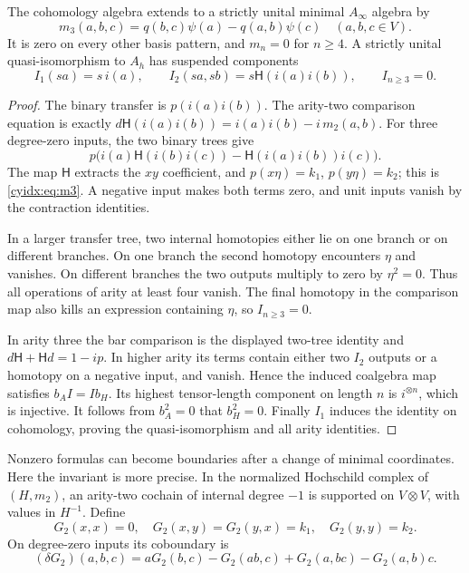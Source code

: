 \begin{theorem}\label{cyidx:thm:ternary}
The cohomology algebra extends to a strictly unital
minimal \(A_\infty\) algebra by
\begin{equation}\label{cyidx:eq:m3}
 m_3(a,b,c)=q(b,c)\psi(a)-q(a,b)\psi(c)
                       \quad(a,b,c\in V).
\end{equation}
It is zero on every other basis pattern, and
\(m_n=0\) for \(n\geq4\).
A strictly unital quasi-isomorphism to \(A_h\) has
suspended components
\begin{equation}\label{cyidx:eq:Ainfty-map}
 I_1(sa)=s\,i(a),\qquad
 I_2(sa,sb)=s\mathsf H(i(a)i(b)),\qquad I_{n\geq3}=0.
\end{equation}
\end{theorem}
\begin{proof}
The binary transfer is \(p(i(a)i(b))\). The arity-two
comparison equation is exactly
\(d\mathsf H(i(a)i(b))=i(a)i(b)-i\,m_2(a,b)\).
For three degree-zero inputs, the two binary trees give
\[
 p\bigl(i(a)\mathsf H(i(b)i(c))
              -\mathsf H(i(a)i(b))i(c)\bigr).
\]
The map \(\mathsf H\) extracts the \(xy\) coefficient,
and \(p(x\eta)=k_1\), \(p(y\eta)=k_2\); this is
\eqref{cyidx:eq:m3}. A negative input makes both
terms zero, and unit inputs vanish by the contraction
identities.

In a larger transfer tree, two internal homotopies
either lie on one branch or on different branches.
On one branch the second homotopy encounters \(\eta\)
and vanishes. On different branches the two outputs
multiply to zero by \(\eta^2=0\). Thus all operations
of arity at least four vanish. The final homotopy in
the comparison map also kills an expression containing
\(\eta\), so \(I_{n\geq3}=0\).

In arity three the bar comparison is the displayed
two-tree identity and \(d\mathsf H+\mathsf Hd=1-ip\).
In higher arity its terms contain either two \(I_2\)
outputs or a homotopy on a negative input, and vanish.
Hence the induced coalgebra map satisfies \(b_A I=I b_H\).
Its highest tensor-length component on length \(n\)
is \(i^{\otimes n}\), which is injective. It follows
from \(b_A^2=0\) that \(b_H^2=0\). Finally \(I_1\)
induces the identity on cohomology, proving the
quasi-isomorphism and all arity identities.
\end{proof}

Nonzero formulas can become boundaries after a change
of minimal coordinates. Here the invariant is more
precise. In the normalized Hochschild complex of
\((H,m_2)\), an arity-two cochain of internal degree
\(-1\) is supported on \(V\otimes V\), with values
in \(H^{-1}\). Define
\begin{equation}\label{cyidx:eq:G2}
 G_2(x,x)=0,\quad G_2(x,y)=G_2(y,x)=k_1,
                 \quad G_2(y,y)=k_2.
\end{equation}
On degree-zero inputs its coboundary is
\[
 (\delta G_2)(a,b,c)=aG_2(b,c)-G_2(ab,c)
                       +G_2(a,bc)-G_2(a,b)c.
\]

